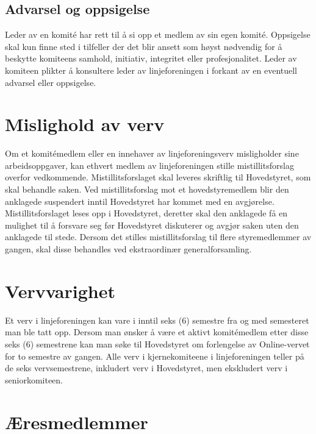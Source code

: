 \subsection{Advarsel og oppsigelse}{
Leder av en komité har rett til å si opp et medlem av sin egen komité. Oppsigelse skal kun finne sted i tilfeller der det blir ansett som høyst nødvendig for å beskytte komiteens samhold, initiativ, integritet eller profesjonalitet. Leder av komiteen plikter å konsultere leder av linjeforeningen i forkant av en eventuell advarsel eller oppsigelse.
}

\section{Mislighold av verv}
\vspace{23pt}

Om et komitémedlem eller en innehaver av linjeforeningsverv misligholder sine arbeidsoppgaver, kan ethvert medlem av linjeforeningen stille mistillitsforslag overfor vedkommende. Mistillitsforslaget skal leveres skriftlig til Hovedstyret, som skal behandle saken. Ved mistillitsforslag mot et hovedstyremedlem blir den anklagede suspendert inntil Hovedstyret har kommet med en avgjørelse. Mistillitsforslaget leses opp i Hovedstyret, deretter skal den anklagede få en mulighet til å forsvare seg før Hovedstyret diskuterer og avgjør saken uten den anklagede til stede. Dersom det stilles mistillitsforslag til flere styremedlemmer av gangen, skal disse behandles ved ekstraordinær generalforsamling.


\section{Vervvarighet}
\vspace{23pt}

Et verv i linjeforeningen kan vare i inntil seks (6) semestre fra og med semesteret man ble tatt opp. Dersom man ønsker å være et aktivt komitémedlem etter disse seks (6) semestrene kan man søke til Hovedstyret om forlengelse av Online-vervet for to semestre av gangen. Alle verv i kjernekomiteene i linjeforeningen teller på de seks vervsemestrene, inkludert verv i Hovedstyret, men ekskludert verv i seniorkomiteen.

\section{Æresmedlemmer}
\vspace{23pt}

